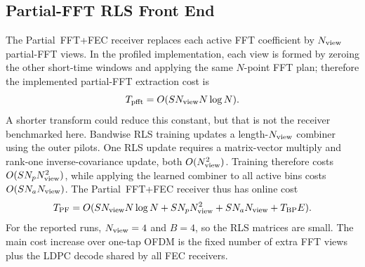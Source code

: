 \documentclass[journal]{IEEEtran}
\begin{document}
\subsection{Partial-FFT RLS Front End}
The Partial~FFT+FEC receiver replaces each active FFT coefficient by
$N_{\rm view}$ partial-FFT views. In the profiled implementation, each view is
formed by zeroing the other short-time windows and applying the same
$N$-point FFT plan; therefore the implemented
partial-FFT extraction cost is
\begin{equation}
  T_{\rm pfft}=O(SN_{\rm view}N\log N).
  \label{eq:pfft-cost}
\end{equation}
A shorter transform could reduce this constant, but that is not the receiver
benchmarked here. Bandwise RLS training updates a length-$N_{\rm view}$ combiner using the
outer pilots. One RLS update requires a matrix-vector multiply and rank-one
inverse-covariance update, both $O(N_{\rm view}^2)$. Training therefore costs
$O(SN_pN_{\rm view}^2)$, while applying the learned combiner to all active bins costs
$O(SN_aN_{\rm view})$. The Partial~FFT+FEC receiver thus has online cost
\begin{equation}
  T_{\rm PF}
  =O(SN_{\rm view}N\log N+SN_pN_{\rm view}^2+SN_aN_{\rm view}+T_{\rm BP}E).
  \label{eq:pf-complexity}
\end{equation}
For the reported runs, $N_{\rm view}=4$ and $B=4$, so the RLS matrices are small.
The main cost increase over one-tap OFDM is the fixed number of extra FFT views
plus the LDPC decode shared by all FEC receivers.
\end{document}
